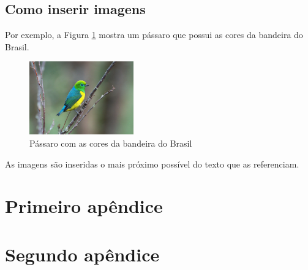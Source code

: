 \documentclass[
	12pt,				%
	twoside,			%
	a4paper,			%
	english,			%
	french,				%
	spanish,			%
	brazil				%
	]{abntex2}
\begin{document}
\section{Como inserir imagens}\label{como-inserir-imagens}

Por exemplo, a Figura \ref{passaro} mostra um pássaro que possui as
cores da bandeira do Brasil.

\begin{figure}[htbp]
\caption{Pássaro com as cores da bandeira do Brasil}\label{passaro}
\begin{center}
\includegraphics[width=0.40000\textwidth]{imagens/passaro.jpg}
\end{center}
\end{figure}

As imagens são inseridas o mais próximo possível do texto que as
referenciam.

\postextual

\postextual


% 
\begin{apendicesenv}

\partapendices

\chapter{Primeiro apêndice}\label{primeiro-apuxeandice}

\lipsum[50]

\chapter{Segundo apêndice}\label{segundo-apuxeandice}

\lipsum[55-57]

\end{apendicesenv}

\end{document}
